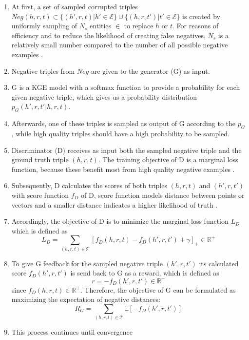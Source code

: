 \begin{enumerate}
    \item 
    At first, a set of sampled corrupted triples $Neg(h,r,t)\subset\{(h',r,t)|h'\in\mathcal{E}\}\cup\{(h,r,t')|t'\in\mathcal{E}\}$ is created by uniformly sampling of $N_s$ entities $\in$ \entities to replace $h$ or $t$.
    For reasons of efficiency and to reduce the likelihood of creating false negatives, $N_s$ is a relatively small number compared to the number of all possible negative examples \cite{cai2017kbgan}.
    
    \item 
    Negative triples from $Neg$ are given to the generator (G) as input.
    
    \item 
    G is a \ac{KGE} model with a softmax function to provide a probability for each given negative triple, which gives us a probability distribution $p_G(h',r,t'|h,r,t)$.

    \item 
    Afterwards, one of these triples is sampled as output of G according to the $p_G$, while high quality triples should have a high probability to be sampled.
    
    \item 
    Discriminator (D) receives as input both the sampled negative triple and the ground truth triple $(h,r,t)$.
    The training objective of D is a marginal loss function, because these benefit most from high quality negative examples \cite{cai2017kbgan}.

    \item 
    Subsequently, D calculates the scores of both triples $(h,r,t)$ and $(h',r,t')$ with score function $f_D$ of D, score function models distance between points or vectors and a smaller distance indicates a higher likelihood of truth \cite{cai2017kbgan}.
    
    \item 
    Accordingly, the objective of D is to minimize the marginal loss function $L_D$ which is defined as
    \begin{equation}
        L_D=\sum_{(h,r,t)\in\mathcal{T}}[f_D(h,r,t)-f_D(h',r,t')+\gamma]_+ \in \mathbb{R}^+
    \end{equation}
    
    \item 
    To give G feedback for the sampled negative triple $(h',r,t')$ its calculated score $f_D(h',r,t')$ is send back to G as a reward, which is defined as
    \begin{equation}
        r = -f_D(h',r,t') \in \mathbb{R}^-
    \end{equation}
    since $f_D(h,r,t) \in \mathbb{R}^+$.
    Therefore, the objective of G can be formulated as maximizing the expectation of negative distances:
    \begin{equation}
        R_G=\sum_{(h,r,t)\in\mathcal{T}}\mathbb{E}[-f_D(h',r,t')]
    \end{equation}
    
    \item
    This process continues until convergence
\end{enumerate}

